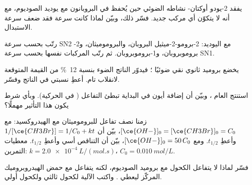 \begin{exercise}[$\star\star$]\label{exo:b1:nucleophilic-substitution:7}
يفقد 2-يودو أوكتان- نشاطه الضوئي حين يُحفظ في البروبانون
مع يوديد الصوديوم، مع أنه لا يتكوّن أي مركب جديد. فسّر ذلك، وبيّن لماذا
كانت سرعة فقد  ضعف سرعة الاستبدال.
\end{exercise}

\begin{exercise}[$\star\star$]\label{exo:b1:nucleophilic-substitution:8}
رتّب بحسب سرعة SN2 مع اليوديد: 2-برومو-2-ميثيل البروبان، والبروموميثان،
و2-بروموبروبان، و1-بروموبروبان. ثم رتّب المركبات نفسها بحسب سرعة 
SN1.
\end{exercise}

\begin{exercise}[$\star\star$]\label{exo:b1:nucleophilic-substitution:9}
يخضع بروميد ثانوي نقي ضوئيًا ؛ فيدوّر الناتج
الضوء بنسبة \qty{12}{\percent} من القيمة المتوقعة لانقلاب
تام. أعطِ نسبتي  في الناتج
وفسّر.
\end{exercise}

\begin{exercise}[$\star\star\star$]\label{exo:b1:nucleophilic-substitution:10}
استنتج  العام  ،
وبيّن أن إضافة أيون   في البداية تبطئ
التفاعل ( في الحركية). وبأي شرط يكون
هذا التأثير مهملًا؟
\end{exercise}

\begin{exercise}[$\star\star\star$]\label{exo:b1:nucleophilic-substitution:11}
زمنا نصف تفاعل للبروموميثان مع الهيدروكسيد: مع
$[\ce{OH-}]_0 = [\ce{CH3Br}]_0 = C_0$، بيّن أن $1/[\ce{CH3Br}] = 1/C_0 +
kt$ وأعطِ $t_{1/2}$. ومع $[\ce{OH-}]_0 = 50\,C_0$، بيّن أن
التناقص أسي وأعطِ $t_{1/2}$. معطيات التمرين: $k =
\qty{2.0e-4}{L/(mol.s)}$، $C_0 = \qty{0.010}{mol/L}$.
\end{exercise}

\begin{exercise}[$\star\star\star$]\label{exo:b1:nucleophilic-substitution:12}
فسّر لماذا لا يتفاعل الكحول  مع بروميد الصوديوم، لكنه
يتفاعل مع حمض الهيدروبروميك المركّز ليعطي . واكتب
الآلية لكحول ثالثي ولكحول أولي.
\end{exercise}

